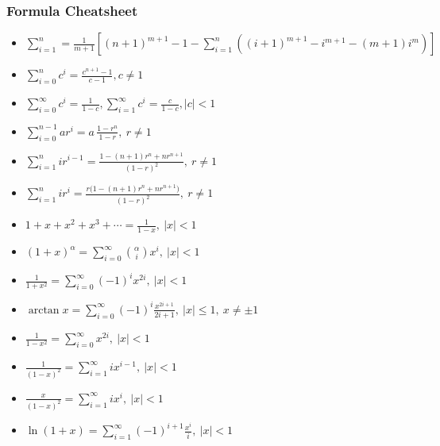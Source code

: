 \subsubsection{Formula Cheatsheet}
\vspace{2.5mm}
\begin{itemize}
    \item $\sum\limits_{i=1}^n = \frac{1}{m+1}[(n+1)^{m+1} - 1 - \sum\limits_{i=1}^n((i+1)^{m+1}-i^{m+1}-(m+1)i^m)]$

    \item $\sum\limits_{i=0}^nc^i = \frac{c^{n+1}-1}{c-1}, c\neq 1$

    \item $\sum\limits_{i=0}^\infty c^i = \frac{1}{1-c}, \sum\limits_{i=1}^\infty c^i = \frac{c}{1-c}, |c|< 1$

    \item $\sum\limits_{i=0}^{n-1} ar^i = a\,\frac{1-r^n}{1-r}, \ r\neq 1$

    \item $\sum\limits_{i=1}^{n} i r^{i-1} = \frac{1 - (n+1) r^{n} + n r^{n+1}}{(1-r)^2}, \ r\neq 1$

    \item $\sum\limits_{i=1}^{n} i r^{i} = \frac{r\big(1 - (n+1) r^{n} + n r^{n+1}\big)}{(1-r)^2}, \ r\neq 1$

    \item $1 + x + x^2 + x^3 + \cdots = \frac{1}{1-x}, \ |x| < 1$

    \item $(1 + x)^\alpha = \sum\limits_{i=0}^\infty \binom{\alpha}{i} x^i, \ |x| < 1$

    \item $\frac{1}{1+x^2} = \sum\limits_{i=0}^\infty (-1)^i x^{2i}, \ |x| < 1$

    \item $\arctan x = \sum\limits_{i=0}^\infty (-1)^i \frac{x^{2i+1}}{2i+1}, \ |x| \le 1, \ x \neq \pm 1$

    \item $\frac{1}{1-x^2} = \sum\limits_{i=0}^\infty x^{2i}, \ |x| < 1$

    \item $\frac{1}{(1-x)^2} = \sum\limits_{i=1}^\infty i x^{i-1}, \ |x| < 1$

    \item $\frac{x}{(1-x)^2} = \sum\limits_{i=1}^\infty i x^{i}, \ |x| < 1$

    \item $\ln(1+x) = \sum\limits_{i=1}^\infty (-1)^{i+1} \frac{x^{i}}{i}, \ |x| < 1$


\end{itemize}
